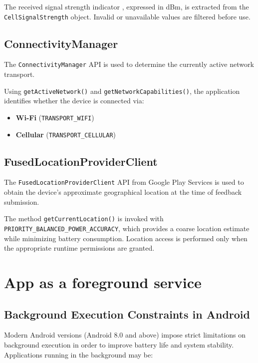 \documentclass{article}
\begin{document}
The received signal strength indicator , expressed in dBm, is extracted from the \texttt{CellSignalStrength} object. Invalid or unavailable values are filtered before use.

\subsection{ConnectivityManager}

The \texttt{ConnectivityManager} API is used to determine the currently active network transport.

Using \texttt{getActiveNetwork()} and \texttt{getNetworkCapabilities()}, the application identifies whether the device is connected via:

\begin{itemize}
    \item \textbf{Wi-Fi} (\texttt{TRANSPORT\_WIFI})
    \item \textbf{Cellular} (\texttt{TRANSPORT\_CELLULAR})
\end{itemize}


\subsection{FusedLocationProviderClient}

The \texttt{FusedLocationProviderClient} API from Google Play Services is used to obtain the device’s approximate geographical location at the time of feedback submission.

The method \texttt{getCurrentLocation()} is invoked with \texttt{PRIORITY\_BALANCED\_POWER\_ACCURACY}, which provides a coarse location estimate while minimizing battery consumption. Location access is performed only when the appropriate runtime permissions are granted.


\section{App as a foreground service}

\subsection{Background Execution Constraints in Android}

Modern Android versions (Android 8.0 and above) impose strict limitations on background execution in order to improve battery life and system stability. Applications running in the background may be:
\end{document}
